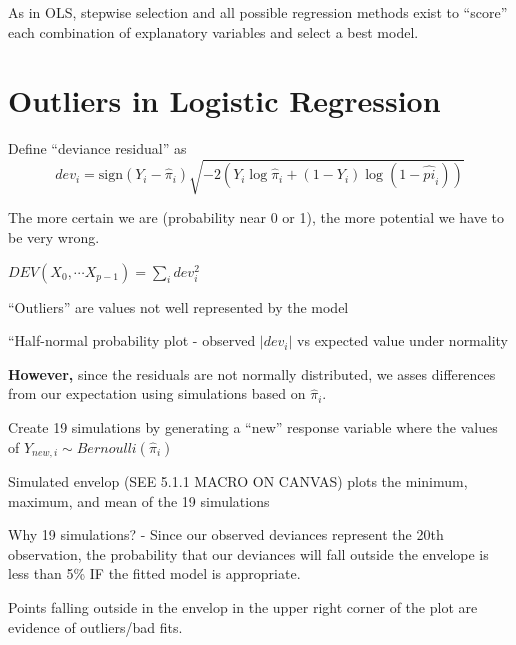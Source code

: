 \documentclass[12pt]{notes}
\begin{document}
\nspace
As in OLS, stepwise selection and all possible regression methods exist to ``score'' each combination of explanatory variables and select a best model. 



\section{Outliers in Logistic Regression}

\begin{minipage}[l][2cm][c]{\textwidth}

\end{minipage}

\bi
\item Define ``deviance residual'' as 
$$dev_i = \text{sign}(Y_i - \hat{\pi}_i)\sqrt{-2\left(Y_i\log\hat{\pi}_i + (1-Y_i)\log(1-\hat{pi}_i)\right)}$$
\bi
\item The more certain we are (probability near 0 or 1), the more potential we have to be very wrong. 
\ei
\item $DEV(X_0, \cdots X_{p-1}) = \sum_i dev_i^2$
\item ``Outliers'' are values not well represented by the model
\item ``Half-normal probability plot - observed $|dev_i|$ vs expected value under normality
\bi
\item \textbf{However,} since the residuals are not normally distributed, we asses differences from our expectation using simulations based on $\hat{\pi}_i$. 
\bi
\item Create 19 simulations by generating a ``new'' response variable where the values of $Y_{new, i} \sim Bernoulli(\hat{\pi}_i)$
\ei
\item Simulated envelop (SEE 5.1.1 MACRO ON CANVAS) plots the minimum, maximum, and mean of the 19 simulations
\bi
\item Why 19 simulations? - Since our observed deviances represent the 20th observation, the probability that our deviances will fall outside the envelope is less than 5\% IF the fitted model is appropriate. 
\item Points falling outside in the envelop in the upper right corner of the plot are evidence of outliers/bad fits. 
\ei
\ei
\ei
\end{document}
